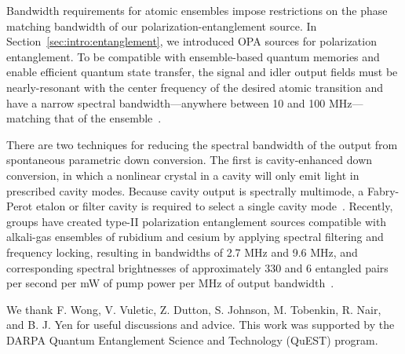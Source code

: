 \documentclass[aps,twocolumn,secnumarabic,amsmath,amssymb,pra,groupedaddress,
showpacs, showkeys,draft]{revtex4-1}
\begin{document}
Bandwidth requirements for atomic ensembles impose restrictions on the phase
matching bandwidth of our polarization-entanglement source. In
Section~\ref{sec:intro:entanglement}, we introduced OPA sources for
polarization entanglement. To be compatible with ensemble-based quantum
memories and enable efficient quantum state transfer, the signal and idler
output fields must be nearly-resonant with the center frequency of the desired
atomic transition and have a narrow spectral bandwidth---anywhere between 10
and 100 MHz---matching that of the ensemble~\cite{2009arXiv0906.2699S}. 

There are two techniques for reducing the spectral bandwidth of the output from
spontaneous parametric down conversion. The first is cavity-enhanced down
conversion, in which a nonlinear crystal in a cavity will only emit light in
prescribed cavity modes. Because cavity output is spectrally multimode, a
Fabry-Perot etalon or filter cavity is required to select a single cavity
mode~\cite{PhysRevLett.97.223601, PhysRevLett.102.063603}. Recently, groups
have created type-II polarization entanglement sources compatible with
alkali-gas ensembles of rubidium and cesium by applying spectral filtering and
frequency locking, resulting in bandwidths of 2.7 MHz and 9.6 MHz, and
corresponding spectral brightnesses of approximately 330 and 6 entangled pairs
per second per mW of pump power per MHz of output
bandwidth~\cite{scholz:201105, PhysRevLett.101.190501}.



\begin{acknowledgments}

  We thank F. Wong, V. Vuletic, Z. Dutton, S. Johnson, M. Tobenkin, R. Nair,
  and B. J. Yen for useful discussions and advice. This work was supported by
  the DARPA Quantum Entanglement Science and Technology (QuEST) program.

\end{acknowledgments}


\end{document}
